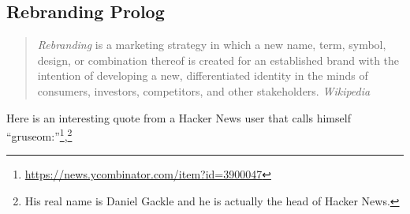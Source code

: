 \subsection{Rebranding Prolog}\label{sec:rebranding-prolog}

\begin{quotation}
\noindent \textit{Rebranding} is a marketing strategy in which a new name, term, symbol, design, or combination thereof is created for an established brand with the intention of developing a new, differentiated identity in the minds of consumers, investors, competitors, and other stakeholders.
\vspace{-0.3cm}
\flushright\textit{Wikipedia}
\vspace{0.5cm}
\end{quotation}

\noindent %
Here is an interesting quote from a Hacker News user that calls himself ``gruseom:''\footnote{\url{https://news.ycombinator.com/item?id=3900047}},\footnote{His real name is Daniel Gackle and he is actually the head of Hacker News.}

